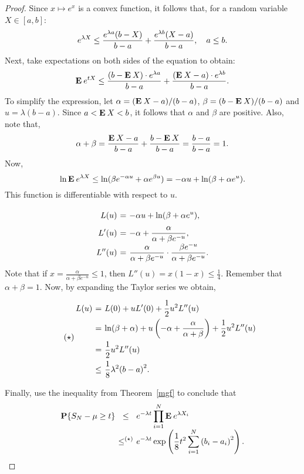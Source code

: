 \begin{proof}
  Since $x \mapsto e^x$ is a convex function, it follows that, for a random variable $X \in [a,b]$:
  \[ e^{\lambda X} \leq \frac{e^{\lambda a}(b-X)}{b-a} + \frac{e^{\lambda b}(X-a)}{b-a},\hspace*{1em} a \leq b. \]
  Next, take expectations on both sides of the equation to obtain:
  \[ \mathbf{E}\: e^{tX} \leq \frac{(b-\mathbf{E}\: X) \cdot e^{\lambda a}}{b-a} + \frac{(\mathbf{E}\: X -a) \cdot e^{\lambda b}}{b-a}. \]
  To simplify the expression, let $\alpha = (\mathbf{E}\: X -a)/(b-a)$, $\beta = (b-\mathbf{E}\: X)/(b-a)$ and $u = \lambda (b-a)$. Since $a < \mathbf{E}\: X < b$, it follows that $\alpha$ and $\beta$ are positive. Also, note that,
  \[ \alpha + \beta = \frac{\mathbf{E}\: X-a}{b-a} + \frac{b-\mathbf{E}\: X}{b-a} = \frac{b-a}{b-a} = 1. \] 
  Now,
  \[ \ln \mathbf{E}\: e^{\lambda X} \leq \ln (\beta e^{-\alpha u} + \alpha e^{\beta u}) = -\alpha u + \ln(\beta + \alpha e^{u}). \] 
  This function is differentiable with respect to $u$.
  \[\everymath{\displaystyle}\arraycolsep=1.8pt\def\arraystretch{1.8}
    \begin{array}{rcl}
    L(u) & = & -\alpha u + \ln(\beta + \alpha e^{u}),\\
    L'(u) & = & -\alpha + \frac{\alpha}{\alpha + \beta e^{-u}},\\
    L''(u) & = & \frac{\alpha}{\alpha + \beta e^{-u}} \cdot \frac{\beta e^{-u}}{\alpha + \beta e^{-u}}.
  \end{array} \]
  Note that if $x = \frac{\alpha}{\alpha + \beta e^{-u}} \leq 1$, then $L''(u) = x(1-x) \leq \frac{1}{4}$. Remember that $\alpha + \beta = 1$. Now, by expanding the Taylor series we obtain,
  \begin{equation}
    \tag{$\star$} \everymath{\displaystyle}\arraycolsep=1.8pt\def\arraystretch{2}
  \begin{array}{rcl}
    L(u) & = & L(0) + uL'(0) + \frac{1}{2} u^2 L''(u)\\
    & = &\ln(\beta + \alpha) + u \left(-\alpha + \frac{\alpha}{\alpha + \beta}\right) + \frac{1}{2} u^2 L''(u) \\
    & = & \frac{1}{2} u^2 L''(u)\\
    &\leq & \frac{1}{8}\lambda^2 {(b-a)}^2.
  \end{array}
  \end{equation}

  Finally, use the inequality from Theorem~\ref{mgf} to conclude that
  \[\everymath{\displaystyle}\arraycolsep=1.8pt\def\arraystretch{2}
    \begin{array}{rcl}
      \P\{S_N-\mu \geq t\} & \leq & e^{-\lambda t} \prod_{i = 1}^N \E e^{\lambda X_i} \\
      &\leq^{(\star)} & e^{-\lambda t} \exp\left(\frac{1}{8}t^2 \sum_{i = 1}^{N} {(b_i-a_i)}^2\right).
    \end{array}\]  

\end{proof}



